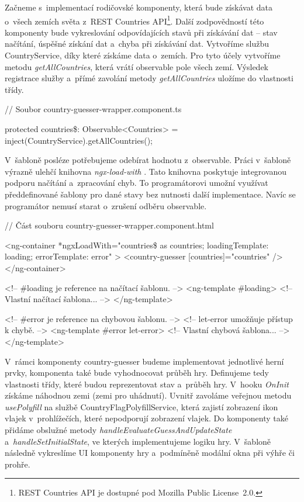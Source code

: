 Začneme s~implementací rodičovské komponenty, která bude získávat data o~všech zemích světa z~REST Countries API\footnote{REST Countries API je dostupné pod Mozilla Public License~2.0.\cite{restcountriesapi}}. 
Další zodpovědností této komponenty bude vykreslování odpovídajících stavů při získávání dat -- stav načítání, úspěšné získání dat a~chyba při získávání dat. 
Vytvoříme službu CountryService, díky které získáme data o~zemích. Pro tyto účely vytvoříme metodu \emph{getAllCountries}, která vrátí observable pole všech zemí. 
Výsledek registrace služby a~přímé zavolání metody \emph{getAllCountries} uložíme do vlastnosti třídy.

\begin{prog}
// Soubor country-guesser-wrapper.component.ts

protected countries\$: Observable<Countries> 
  = inject(CountryService).getAllCountries();
\end{prog}

V~šabloně posléze potřebujeme odebírat hodnotu z~observable. Práci v~šabloně výrazně ulehčí knihovna \emph{ngx-load-with} \cite{ngxloadwith}. 
Tato knihovna poskytuje integrovanou podporu načítání a~zpracování chyb. To programátorovi umožní využívat předdefinované šablony pro dané stavy bez nutnosti další implementace. 
Navíc se programátor nemusí starat o~zrušení odběru observable.

\begin{prog}
// Část souboru country-guesser-wrapper.component.html

<ng-container
  *ngxLoadWith="countries\$ as countries; 
  loadingTemplate: loading; errorTemplate: error"
>
  <country-guesser [countries]="countries" />
</ng-container>

<!-- \#loading je reference na načítací šablonu. -->
<ng-template \#loading>
  <!-- Vlastní načítací šablona... -->
</ng-template>

<!-- \#error je reference na chybovou šablonu. -->
<!-- let-error umožňuje přístup k chybě. -->
<ng-template \#error let-error>
  <!-- Vlastní chybová šablona... -->
</ng-template>
\end{prog}

V~rámci komponenty country-guesser budeme implementovat jednotlivé herní prvky, komponenta také bude vyhodnocovat průběh hry. 
Definujeme tedy vlastnosti třídy, které budou reprezentovat stav a~průběh hry. V~hooku \emph{OnInit} získáme náhodnou zemi (zemi pro uhádnutí). 
Uvnitř zavoláme veřejnou metodu \emph{usePolyfill} na službě CountryFlagPolyfillService, která zajistí zobrazení ikon vlajek v~prohlížečích, které nepodporují zobrazení vlajek.
Do komponenty také přidáme obslužné metody \emph{handleEvaluateGuessAndUpdateState} a~\emph{handleSetInitialState}, ve kterých implementujeme logiku hry. 
V~šabloně následně vykreslíme UI komponenty hry a~podmíněně modální okna při výhře či prohře.

